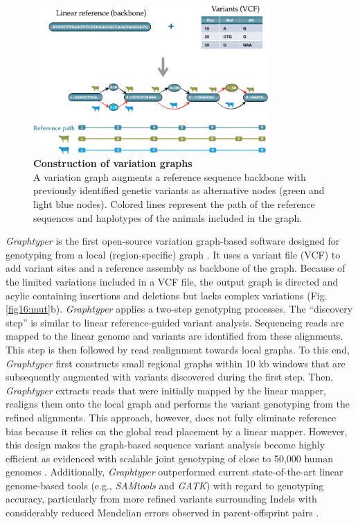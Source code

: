 \documentclass[../main.tex]{subfiles}
\begin{document}
\begin{figure}[!htb]
    \centering
    \includegraphics[width=0.8\textwidth]{intro/fig5.pdf}
        \vspace{3mm}
        \caption[Construction of variation graphs]{\textbf{Construction of variation graphs} \\
        \footnotesize{A variation graph augments a reference sequence backbone with previously identified genetic variants as alternative nodes (green and light blue nodes). Colored lines represent the path of the reference sequences and haplotypes of the animals included in the graph.}}
        \label{fig15:vargr}
\end{figure}

\emph{Graphtyper }is the first open-source variation graph-based software designed for genotyping from a local (region-specific) graph \citep{eggertsson2017graphtyper,eggertsson2019graphtyper2}. It uses a variant file (VCF) to add variant sites and a reference assembly as backbone of the graph. Because of the limited variations included in a VCF file, the output graph is directed and acylic containing insertions and deletions but lacks complex variations (Fig. \ref{fig16:mut}b). \emph{Graphtyper} applies a two-step genotyping processes. The  “discovery step” is similar to linear reference-guided variant analysis. Sequencing reads are mapped to the linear genome and variants are identified from these alignments. This step is then followed by read realignment towards local graphs. To this end, \emph{Graphtyper} first constructs small regional graphs within 10 kb windows that are subsequently augmented with variants discovered during the first step. Then, \emph{Graphtyper} extracts reads that were initially mapped by the linear mapper, realigns them onto the local graph and performs the variant genotyping from the refined alignments. This approach, however, does not  fully  eliminate reference bias because it relies on the global read placement by a linear mapper. However, this design makes the graph-based sequence variant analysis become highly efficient as evidenced with scalable joint genotyping of close to 50,000 human genomes \citep{eggertsson2019graphtyper2}. Additionally, \emph{Graphtyper} outperformed current state-of-the-art linear genome-based tools (e.g., \emph{SAMtools} and \emph{GATK}) with regard to genotyping accuracy, particularly from more refined variants surrounding Indels with considerably reduced Mendelian errors observed in parent-offsprint pairs \citep{eggertsson2017graphtyper}.
\end{document}
